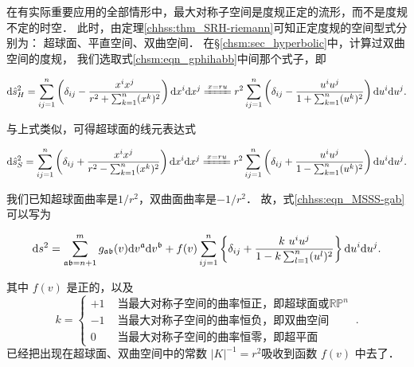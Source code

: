 在有实际重要应用的全部情形中，最大对称子空间是度规正定的流形，而不是度规不定的时空．
此时，由定理\ref{chhss:thm_SRH-riemann}可知正定度规的空间型式分别为：
超球面、平直空间、双曲空间．
在\S\ref{chsm:sec_hyperbolic}中，计算过双曲空间的度规，
我们选取式\eqref{chsm:eqn_gphihabb}中间那个式子，即
\begin{small}  %
\begin{align*}
    {\rm d}\hat{s}^2_H= \sum_{ij=1}^{n}\left(\delta_{ij}-\frac{x^i x^j}{r^2+\sum_{k=1}^{n}(x^k)^2}\right) {\rm d} x^i {\rm d} x^j 
    \xlongequal{x=ru} r^2 \sum_{ij=1}^{n}\left(\delta_{ij}-\frac{ u^i u^j}{1+\sum_{k=1}^{n}(u^k)^2}\right)  {\rm d} u^i {\rm d} u^j .
\end{align*}  %
\end{small}
与上式类似，可得超球面的线元表达式
\begin{small} %
\begin{align*}
    {\rm d}\hat{s}^2_S= \sum_{ij=1}^{n}\left(\delta_{ij}+\frac{x^i x^j}{r^2-\sum_{k=1}^{n}(x^k)^2}\right) {\rm d} x^i {\rm d} x^j 
    \xlongequal{x=ru} r^2 \sum_{ij=1}^{n}\left(\delta_{ij}+\frac{ u^i u^j}{1-\sum_{k=1}^{n}(u^k)^2}\right)  {\rm d} u^i {\rm d} u^j .
\end{align*} %
\end{small}
我们已知超球面曲率是$1/r^2$，双曲面曲率是$-1/r^2$．
故，式\eqref{chhss:eqn_MSSS-gab}可以写为
\begin{small}
\begin{equation}\label{chhss:eqn_pg-mss}
    \mathrm{d} s^2=\sum_{\mathfrak{ab}=n+1}^{m} 
    g_{\mathfrak{ab}}(v) {\rm d} v^{\mathfrak{a}} {\rm d} v^{\mathfrak{b}}
    +f(v) \sum_{ij=1}^{n} \left\{\delta_{ij} + \frac{k \ u^i u^j}{1-k \sum_{l=1}^{n}(u^l)^2}\right\} 
    {\rm d} u^i {\rm d} u^j.
\end{equation}
\end{small}
其中 $f(v)$ 是正的，以及
\begin{equation}
    k= \begin{cases}
        +1 & \text { 当最大对称子空间的曲率恒正，即超球面或}\mathbb{RP}^n \\ 
        -1 & \text { 当最大对称子空间的曲率恒负，即双曲空间} \\ 
        0  & \text { 当最大对称子空间的曲率恒零，即超平面}
        \end{cases} \  .
\end{equation}
已经把出现在超球面、双曲空间中的常数 $|K|^{-1}=r^2$吸收到函数 $f(v)$ 中去了．


